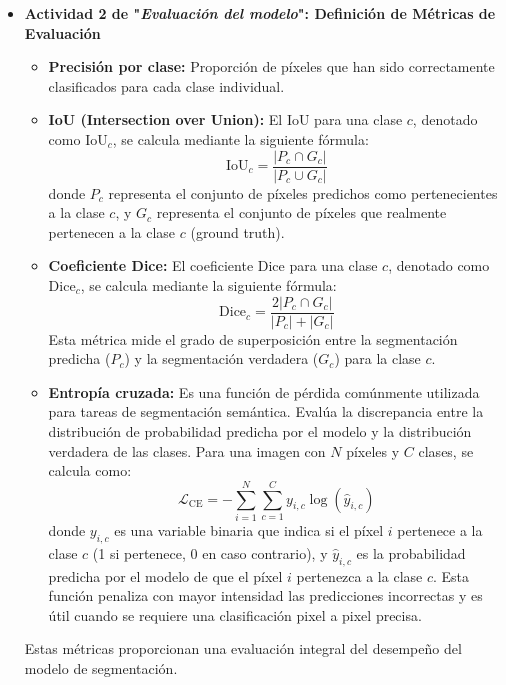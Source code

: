 \begin{enumerate}
\begin{itemize}
  
    \item \textbf{Actividad 2 de "\textit{Evaluación del modelo}": Definición de Métricas de Evaluación}
     \begin{itemize}
  \item \textbf{Precisión por clase:} Proporción de píxeles que han sido correctamente clasificados para cada clase individual.

  \item \textbf{IoU (Intersection over Union):} El IoU para una clase $c$, denotado como $\text{IoU}_c$, se calcula mediante la siguiente fórmula:
$$\text{IoU}_c = \frac{|P_c \cap G_c|}{|P_c \cup G_c|}$$
donde $P_c$ representa el conjunto de píxeles predichos como pertenecientes a la clase $c$, y $G_c$ representa el conjunto de píxeles que realmente pertenecen a la clase $c$ (ground truth).

  \item \textbf{Coeficiente Dice:} El coeficiente Dice para una clase $c$, denotado como $\text{Dice}_c$, se calcula mediante la siguiente fórmula:
$$\text{Dice}_c = \frac{2|P_c \cap G_c|}{|P_c| + |G_c|}$$
Esta métrica mide el grado de superposición entre la segmentación predicha ($P_c$) y la segmentación verdadera ($G_c$) para la clase $c$.
 

  \item \textbf{Entropía cruzada:} Es una función de pérdida comúnmente utilizada para tareas de segmentación semántica. Evalúa la discrepancia entre la distribución de probabilidad predicha por el modelo y la distribución verdadera de las clases. Para una imagen con $N$ píxeles y $C$ clases, se calcula como:
$$\mathcal{L}_{\text{CE}} = -\sum_{i=1}^{N} \sum_{c=1}^{C} y_{i,c} \log(\hat{y}_{i,c})$$
donde $y_{i,c}$ es una variable binaria que indica si el píxel $i$ pertenece a la clase $c$ (1 si pertenece, 0 en caso contrario), y $\hat{y}_{i,c}$ es la probabilidad predicha por el modelo de que el píxel $i$ pertenezca a la clase $c$. Esta función penaliza con mayor intensidad las predicciones incorrectas y es útil cuando se requiere una clasificación pixel a pixel precisa.
\end{itemize}

Estas métricas proporcionan una evaluación integral del desempeño del modelo de segmentación.


\end{itemize}
\end{enumerate}
